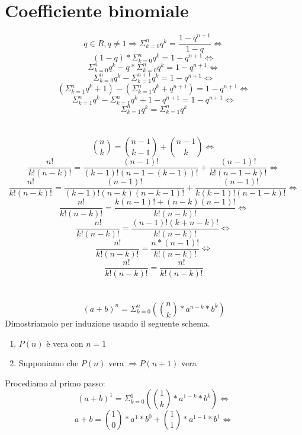 \documentclass{report}
\begin{document}
\section{Coefficiente binomiale}
    $$q \in R, q \neq 1 \Longrightarrow \Sigma_{k=0}^{n}q^k = \frac{1-q^{n+1}}{1-q} \Longleftrightarrow$$
    $$(1-q) * \Sigma_{k=0}^{n}q^k = 1-q^{n+1} \Longleftrightarrow$$
    $$\Sigma_{k=0}^{n}q^k - q * \Sigma_{k=0}^{n}q^k = 1-q^{n+1} \Longleftrightarrow$$
    $$\Sigma_{k=0}^{n}q^k - \Sigma_{k=1}^{n+1}q^k = 1 - q^{n+1} \Longleftrightarrow$$
    $$\left(\Sigma_{k=1}^{n}q^k + 1\right) - \left(\Sigma_{k=1}^{n}q^k + q^{n+1}\right) = 1 - q^{n+1} \Longleftrightarrow$$
    $$\Sigma_{k=1}^{n}q^k - \Sigma_{k=1}^{n}q^k + 1 - q^{n+1} = 1 - q^{n+1} \Longleftrightarrow$$
    $$\Sigma_{k=1}^{n}q^k = \Sigma_{k=1}^{n}q^k$$ 
    \\ \\
    $$\binom{n}{k} = \binom{n-1}{k-1} + \binom{n-1}{k} \Longleftrightarrow$$
    $$\frac{n!}{k!\left(n-k\right)!} = 
        \frac{\left(n-1\right)!}{\left(k-1\right)!\left(n-1-\left(k-1\right)\right)!} + \frac{\left(n-1\right)!}{k!\left(n-1-k\right)!} \Longleftrightarrow$$
    $$\frac{n!}{k!\left(n-k\right)!} = 
        \frac{\left(n-1\right)!}{\left(k-1\right)!\left(n-k\right)\left(n-k-1\right)!} + \frac{\left(n-1\right)!}{k\left(k-1\right)!\left(n-1-k\right)!} \Longleftrightarrow$$
    $$\frac{n!}{k!\left(n-k\right)!} = 
        \frac{k\left(n-1\right)! + \left(n-k\right)\left(n-1\right)!}{k!\left(n-k\right)!} \Longleftrightarrow$$
    $$\frac{n!}{k!\left(n-k\right)!} = 
        \frac{\left(n-1\right)!\left(k+n-k\right)!}{k!\left(n-k\right)!} \Longleftrightarrow$$
    $$\frac{n!}{k!\left(n-k\right)!} = \frac{n * \left(n-1\right)!}{k!\left(n-k\right)!} \Longleftrightarrow$$
    $$\frac{n!}{k!\left(n-k\right)!} = \frac{n!}{k!\left(n-k\right)!}$$
    \\ \\
    $$\left(a+b\right)^n = \Sigma_{k=0}^{n}\left(\binom{n}{k} * a^{n-k} * b^k\right)$$
    Dimostriamolo per induzione usando il seguente schema.
    \begin{enumerate}
        \item $P\left(n\right)$ è vera con $n=1$
        \item Supponiamo che $P\left(n\right)$ vera $\Longrightarrow P\left(n+1\right)$ vera
    \end{enumerate}
    Procediamo al primo passo:
    $$\left(a+b\right)^1 = \Sigma_{k=0}^{1}\left(\binom{1}{k} * a^{1-k} * b^k\right) \Longleftrightarrow$$
    $$a+b = \binom{1}{0} * a^1 * b^0 + \binom{1}{1} * a^{1-1} * b^1 \Longleftrightarrow$$
\end{document}
